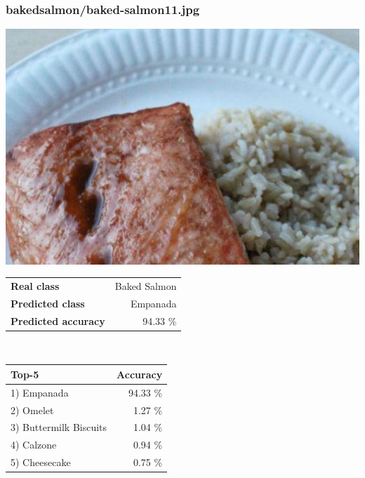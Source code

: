 \subsubsection{baked\textunderscore salmon/baked-salmon11.jpg}

\begin{minipage}[t]{0.4\textwidth}
	\vspace{0pt}
	\includegraphics[width=\linewidth]{images/evaluation-images/baked_salmon/baked-salmon11.jpg}
\end{minipage}
\hfill
\begin{minipage}[t]{0.5\textwidth}
	\vspace{0pt}\raggedright
	\begin{tabularx}{\textwidth}{X r}
		\small \textbf{Real class} & \small Baked Salmon\\
		\small \textbf{Predicted class} & \small Empanada\\
		\small \textbf{Predicted accuracy} & \small 94.33 \%
    \end{tabularx}\\
    
    \vspace{6pt}
	\begin{tabularx}{\textwidth}{X r}
        \small \textbf{Top-5} & \small \textbf{Accuracy} \\
        \hline
		\small 1) Empanada & \small 94.33 \%\\\small 2) Omelet & \small 1.27 \%\\\small 3) Buttermilk Biscuits & \small 1.04 \%\\\small 4) Calzone & \small 0.94 \%\\\small 5) Cheesecake & \small 0.75 \%
    \end{tabularx}
\end{minipage}
    
